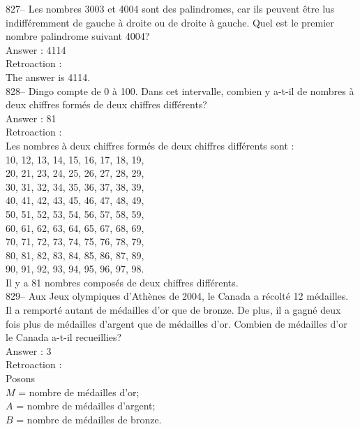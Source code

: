 ﻿\documentclass[letterpaper, 12pt]{article}
\begin{document}
827-- Les nombres 3003 et 4004 sont des palindromes, car ils peuvent \^etre
lus indiff\'eremment de gauche \`a droite ou de droite \`a gauche.  Quel est
le premier nombre palindrome suivant 4004?\\

Answer : 4114\\

Retroaction :\\
The answer is 4114.\\

828-- Dingo compte de 0 \`a 100.  Dans cet intervalle, combien y a-t-il de
nombres \`a deux chiffres form\'es de deux chiffres diff\'erents?\\

Answer : 81\\

Retroaction : \\
Les nombres \`a deux chiffres form\'es de deux chiffres diff\'erents sont :
\\
10, 12, 13, 14, 15, 16, 17, 18, 19, \\
20, 21, 23, 24, 25, 26, 27, 28, 29, \\
30, 31, 32, 34, 35, 36, 37, 38, 39, \\
40, 41, 42, 43, 45, 46, 47, 48, 49, \\
50, 51, 52, 53, 54, 56, 57, 58, 59, \\
60, 61, 62, 63, 64, 65, 67, 68, 69, \\
70, 71, 72, 73, 74, 75, 76, 78, 79, \\
80, 81, 82, 83, 84, 85, 86, 87, 89, \\
90, 91, 92, 93, 94, 95, 96, 97, 98. \\

Il y a 81 nombres compos\'es de deux chiffres diff\'erents.\\


829-- Aux Jeux olympiques d'Ath\`enes de 2004, le Canada a r\'ecolt\'e 12
m\'edailles.  Il a remport\'e autant de m\'edailles d'or que de bronze.  De
plus, il a gagn\'e  deux fois plus de m\'edailles d'argent que de
m\'edailles d'or.  Combien de m\'edailles d'or le Canada a-t-il
recueillies?\\

Answer : 3\\

Retroaction : \\
Posons\\
$M$ = nombre de m\'edailles d'or;\\
$A$ = nombre de m\'edailles d'argent;\\
$B$ = nombre de m\'edailles de bronze.\\
\end{document}
